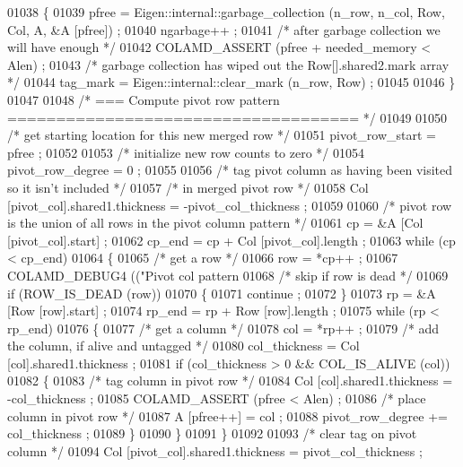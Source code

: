 \begin{DoxyCode}
{{{{{{{{{{{{{{{{{{{01038     \{
01039       pfree = Eigen::internal::garbage\_collection (n\_row, n\_col, Row, Col, A, &A [pfree]) ;
01040       ngarbage++ ;
01041       \textcolor{comment}{/* after garbage collection we will have enough */}
01042       COLAMD\_ASSERT (pfree + needed\_memory < Alen) ;
01043       \textcolor{comment}{/* garbage collection has wiped out the Row[].shared2.mark array */}
01044       tag\_mark = Eigen::internal::clear\_mark (n\_row, Row) ;
01045 
01046     \}
01047 
01048     \textcolor{comment}{/* === Compute pivot row pattern ==================================== */}
01049 
01050     \textcolor{comment}{/* get starting location for this new merged row */}
01051     pivot\_row\_start = pfree ;
01052 
01053     \textcolor{comment}{/* initialize new row counts to zero */}
01054     pivot\_row\_degree = 0 ;
01055 
01056     \textcolor{comment}{/* tag pivot column as having been visited so it isn't included */}
01057     \textcolor{comment}{/* in merged pivot row */}
01058     Col [pivot\_col].shared1.thickness = -pivot\_col\_thickness ;
01059 
01060     \textcolor{comment}{/* pivot row is the union of all rows in the pivot column pattern */}
01061     cp = &A [Col [pivot\_col].start] ;
01062     cp\_end = cp + Col [pivot\_col].length ;
01063     \textcolor{keywordflow}{while} (cp < cp\_end)
01064     \{
01065       \textcolor{comment}{/* get a row */}
01066       row = *cp++ ;
01067       COLAMD\_DEBUG4 ((\textcolor{stringliteral}{"Pivot col pattern %
01068       \textcolor{comment}{/* skip if row is dead */}
01069       \textcolor{keywordflow}{if} (ROW\_IS\_DEAD (row))
01070       \{
01071     continue ;
01072       \}
01073       rp = &A [Row [row].start] ;
01074       rp\_end = rp + Row [row].length ;
01075       \textcolor{keywordflow}{while} (rp < rp\_end)
01076       \{
01077     \textcolor{comment}{/* get a column */}
01078     col = *rp++ ;
01079     \textcolor{comment}{/* add the column, if alive and untagged */}
01080     col\_thickness = Col [col].shared1.thickness ;
01081     \textcolor{keywordflow}{if} (col\_thickness > 0 && COL\_IS\_ALIVE (col))
01082     \{
01083       \textcolor{comment}{/* tag column in pivot row */}
01084       Col [col].shared1.thickness = -col\_thickness ;
01085       COLAMD\_ASSERT (pfree < Alen) ;
01086       \textcolor{comment}{/* place column in pivot row */}
01087       A [pfree++] = col ;
01088       pivot\_row\_degree += col\_thickness ;
01089     \}
01090       \}
01091     \}
01092 
01093     \textcolor{comment}{/* clear tag on pivot column */}
01094     Col [pivot\_col].shared1.thickness = pivot\_col\_thickness ;
}}}}}}}}}}}}}}}}}}}}
\end{DoxyCode}

